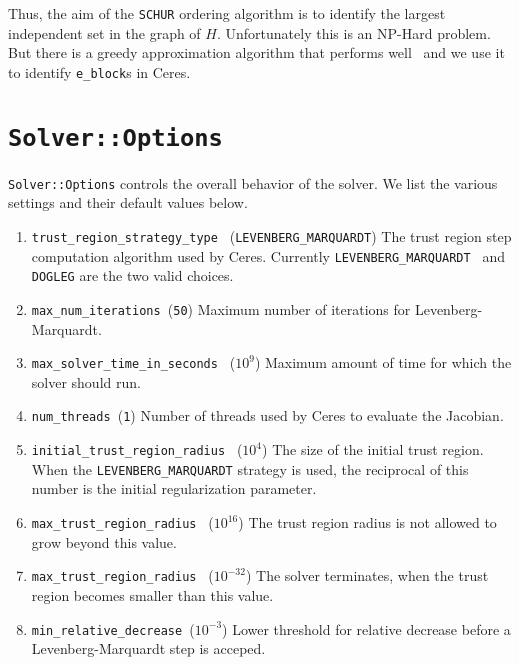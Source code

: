 Thus, the aim of the \texttt{SCHUR} ordering algorithm is to identify the largest independent set in the graph of $H$. Unfortunately this is an NP-Hard problem. But there is a  greedy approximation algorithm that performs well~\cite{li2007miqr} and we use it to identify \texttt{e\_block}s in Ceres.

\section{\texttt{Solver::Options}}

\texttt{Solver::Options} controls the overall behavior of the solver. We list the various settings and their default values below.

\begin{enumerate}
    
\item{\texttt{trust\_region\_strategy\_type }} (\texttt{LEVENBERG\_MARQUARDT}) The  trust region step computation algorithm used by Ceres. Currently \texttt{LEVENBERG\_MARQUARDT } and \texttt{DOGLEG} are the two valid choices.

\item{\texttt{max\_num\_iterations }}(\texttt{50}) Maximum number of iterations for Levenberg-Marquardt.

\item{\texttt{max\_solver\_time\_in\_seconds }} ($10^9$) Maximum amount of time for which the solver should run.

\item{\texttt{num\_threads }}(\texttt{1})
Number of threads used by Ceres to evaluate the Jacobian.

\item{\texttt{initial\_trust\_region\_radius } ($10^4$)} The size of the initial trust region. When the \texttt{LEVENBERG\_MARQUARDT} strategy is used, the reciprocal of this number is the initial regularization parameter.

\item{\texttt{max\_trust\_region\_radius } ($10^{16}$)} The trust region radius is not allowed to grow beyond this value.
\item{\texttt{max\_trust\_region\_radius } ($10^{-32}$)} The solver terminates, when the trust region becomes smaller than this value.

\item{\texttt{min\_relative\_decrease }}($10^{-3}$) Lower threshold for relative decrease before a Levenberg-Marquardt step is acceped.


\end{enumerate}
